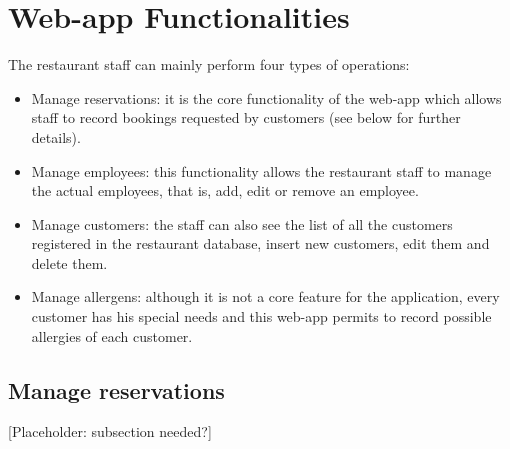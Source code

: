 \documentclass{article}
\begin{document}
\section*{Web-app Functionalities}
The restaurant staff can mainly perform four types of operations:
\begin{itemize}
    \item Manage reservations: it is the core functionality of the web-app which allows staff to record bookings requested by customers (see below for further details).
    \item Manage employees: this functionality allows the restaurant staff to manage the actual employees, that is, add, edit or remove an employee.
    \item Manage customers: the staff can also see the list of all the customers registered in the restaurant database, insert new customers, edit them and delete them.
    \item Manage allergens: although it is not a core feature for the application, every customer has his special needs and this web-app permits to record possible allergies of each customer.
\end{itemize}

\subsection*{Manage reservations}
[Placeholder: subsection needed?]

\clearpage
\end{document}
